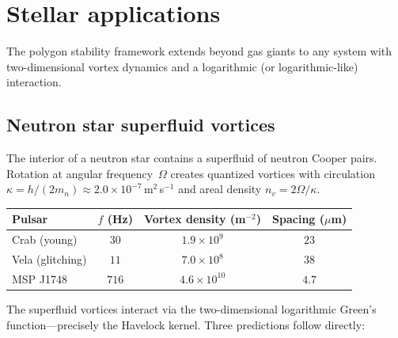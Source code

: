 \section{Stellar applications}
\label{sec:stellar}

The polygon stability framework extends beyond gas giants to any
system with two-dimensional vortex dynamics and a logarithmic
(or logarithmic-like) interaction.

\subsection{Neutron star superfluid vortices}

The interior of a neutron star contains a superfluid of neutron
Cooper pairs.  Rotation at angular frequency~$\Omega$ creates
quantized vortices with circulation
$\kappa = h/(2m_n) \approx 2.0 \times 10^{-7}$\,m$^2$\,s$^{-1}$
and areal density $n_v = 2\Omega/\kappa$.

\begin{center}
\small
\begin{tabular}{lccc}
\toprule
Pulsar & $f$ (Hz) & Vortex density (m$^{-2}$) & Spacing ($\mu$m) \\
\midrule
Crab (young) & $30$ & $1.9 \times 10^9$ & $23$ \\
Vela (glitching) & $11$ & $7.0 \times 10^8$ & $38$ \\
MSP J1748 & $716$ & $4.6 \times 10^{10}$ & $4.7$ \\
\bottomrule
\end{tabular}
\end{center}

\noindent
The superfluid vortices interact via the two-dimensional
logarithmic Green's function---precisely the Havelock kernel.
Three predictions follow directly:

